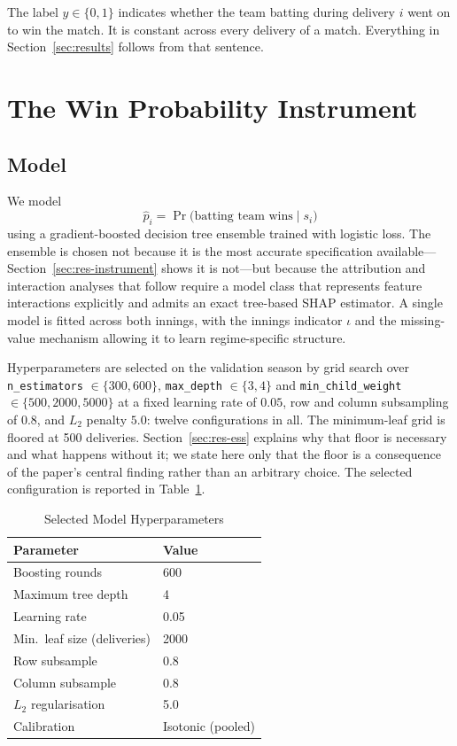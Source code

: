 \documentclass[conference]{IEEEtran}
\begin{document}
The label $y \in \{0,1\}$ indicates whether the team batting during
delivery $i$ went on to win the match. It is constant across every
delivery of a match. Everything in Section~\ref{sec:results} follows
from that sentence.

\section{The Win Probability Instrument}
\label{sec:method}

\subsection{Model}

We model
\[
\hat{p}_i = \Pr\big(\text{batting team wins} \mid s_i\big)
\]
using a gradient-boosted decision tree ensemble \cite{chen2016} trained
with logistic loss. The ensemble is chosen not because it is the most
accurate specification available---Section~\ref{sec:res-instrument}
shows it is not---but because the attribution and interaction analyses
that follow require a model class that represents feature interactions
explicitly and admits an exact tree-based SHAP estimator. A single model
is fitted across both innings, with the innings indicator $\iota$ and
the missing-value mechanism allowing it to learn regime-specific
structure.

Hyperparameters are selected on the validation season by grid search
over \texttt{n\_estimators} $\in \{300, 600\}$, \texttt{max\_depth} $\in
\{3, 4\}$ and \texttt{min\_child\_weight} $\in \{500, 2000, 5000\}$ at a
fixed learning rate of $0.05$, row and column subsampling of $0.8$, and
$L_2$ penalty $5.0$: twelve configurations in all. The minimum-leaf grid
is floored at 500 deliveries. Section~\ref{sec:res-ess} explains why
that floor is necessary and what happens without it; we state here only
that the floor is a consequence of the paper's central finding rather
than an arbitrary choice. The selected configuration is reported in
Table~\ref{tab:hyper}.

\begin{table}[htbp]
\caption{Selected Model Hyperparameters}
\label{tab:hyper}
\centering
\begin{tabular}{ll}
\toprule
\textbf{Parameter} & \textbf{Value} \\
\midrule
Boosting rounds & 600 \\
Maximum tree depth & 4 \\
Learning rate & 0.05 \\
Min.\ leaf size (deliveries) & 2000 \\
Row subsample & 0.8 \\
Column subsample & 0.8 \\
$L_2$ regularisation & 5.0 \\
Calibration & Isotonic (pooled) \\
\bottomrule
\end{tabular}
\end{table}
\end{document}
